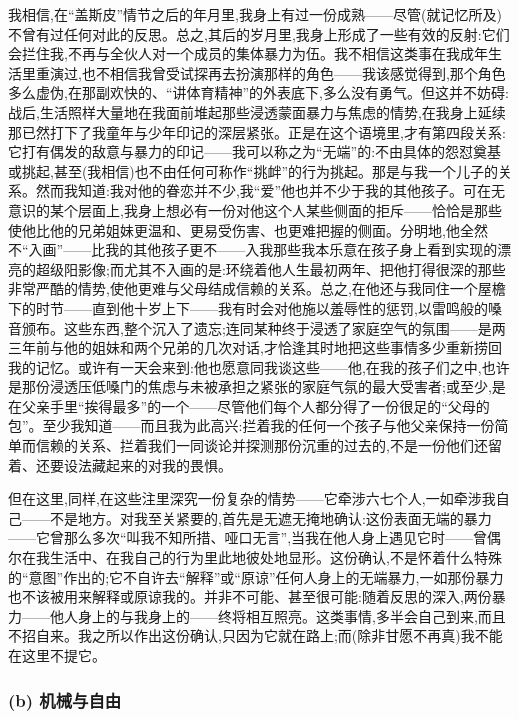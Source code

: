 我相信,在“盖斯皮”情节之后的年月里,我身上有过一份成熟——尽管(就记忆所及)不曾有过任何对此的反思。总之,其后的岁月里,我身上形成了一些有效的反射:它们会拦住我,不再与全伙人对一个成员的集体暴力为伍。我不相信这类事在我成年生活里重演过,也不相信我曾受试探再去扮演那样的角色——我该感觉得到,那个角色多么虚伪,在那副欢快的、“讲体育精神”的外表底下,多么没有勇气。但这并不妨碍:战后,生活照样大量地在我面前堆起那些浸透蒙面暴力与焦虑的情势,在我身上延续那已然打下了我童年与少年印记的深层紧张。正是在这个语境里,才有第四段关系:它打有偶发的敌意与暴力的印记——我可以称之为“无端”的:不由具体的怨怼奠基或挑起,甚至(我相信)也不由任何可称作“挑衅”的行为挑起。那是与我一个儿子的关系。然而我知道:我对他的眷恋并不少,我“爱”他也并不少于我的其他孩子。可在无意识的某个层面上,我身上想必有一份对他这个人某些侧面的拒斥——恰恰是那些使他比他的兄弟姐妹更温和、更易受伤害、也更难把握的侧面。分明地,他全然不“入画”——比我的其他孩子更不——入我那些我本乐意在孩子身上看到实现的漂亮的超级阳影像;而尤其不入画的是:环绕着他人生最初两年、把他打得很深的那些非常严酷的情势,使他更难与父母结成信赖的关系。总之,在他还与我同住一个屋檐下的时节——直到他十岁上下——我有时会对他施以羞辱性的惩罚,以雷鸣般的嗓音颁布。这些东西,整个沉入了遗忘;连同某种终于浸透了家庭空气的氛围——是两三年前与他的姐妹和两个兄弟的几次对话,才恰逢其时地把这些事情多少\dmark{}重新捞回我的记忆。或许有一天会来到:他也愿意同我谈这些——他,在我的孩子们之中,也许是那份浸透压低嗓门的焦虑与未被承担之紧张的家庭气氛的最大受害者;或至少,是在父亲手里“挨得最多”的一个——尽管他们每个人都分得了一份很足的“父母的包”。至少我知道——而且我为此高兴:拦着我的任何一个孩子与他父亲保持一份简单而信赖的关系、拦着我们一同谈论并探测那份沉重的过去的,不是一份他们还留着、还要设法藏起来的对我的畏惧。

但在这里,同样,在这些注里深究一份复杂的情势——它牵涉六七个人,一如牵涉我自己——不是地方。对我至关紧要的,首先是无遮无掩地确认:这份表面无端的暴力——它曾那么多次“叫我不知所措、哑口无言”,当我在他人身上遇见它时——曾偶尔在我生活中、在我自己的行为里此地彼处地显形。这份确认,不是怀着什么特殊的“意图”作出的;它不自许去“解释”或“原谅”任何人身上的无端暴力,一如那份暴力也不该被用来解释或原谅我的。并非不可能、甚至很可能:随着反思的深入,两份暴力——他人身上的与我身上的——终将相互照亮。这类事情,多半会自己到来,而且不招自来。我之所以作出这份确认,只因为它就在路上;而(除非甘愿不再真)我不能在这里不提它。

\subsubsection*{(b) 机械与自由}
\label{ch18:local:h55}

